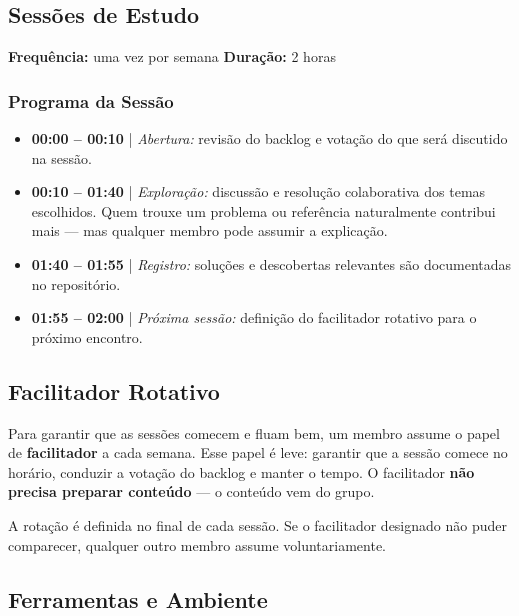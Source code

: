 \documentclass[12pt, a4paper]{article}
\begin{document}
\subsection{Sessões de Estudo}

\begin{infobox}
  \textbf{Frequência:} uma vez por semana \quad\textbf{Duração:} 2 horas
\end{infobox}

\subsubsection{Programa da Sessão}

\begin{itemize}
  \item \textbf{00:00 -- 00:10} | \textit{Abertura:} revisão do backlog e votação do que
    será discutido na sessão.
  \item \textbf{00:10 -- 01:40} | \textit{Exploração:} discussão e resolução colaborativa
    dos temas escolhidos. Quem trouxe um problema ou referência naturalmente contribui mais
    --- mas qualquer membro pode assumir a explicação.
  \item \textbf{01:40 -- 01:55} | \textit{Registro:} soluções e descobertas relevantes são
    documentadas no repositório.
  \item \textbf{01:55 -- 02:00} | \textit{Próxima sessão:} definição do facilitador
    rotativo para o próximo encontro.
\end{itemize}

\subsection{Facilitador Rotativo}

Para garantir que as sessões comecem e fluam bem, um membro assume o papel de
\textbf{facilitador} a cada semana. Esse papel é leve: garantir que a sessão comece no
horário, conduzir a votação do backlog e manter o tempo. O facilitador \textbf{não precisa
preparar conteúdo} --- o conteúdo vem do grupo.

A rotação é definida no final de cada sessão. Se o facilitador designado não puder
comparecer, qualquer outro membro assume voluntariamente.

\subsection{Ferramentas e Ambiente}
\end{document}
